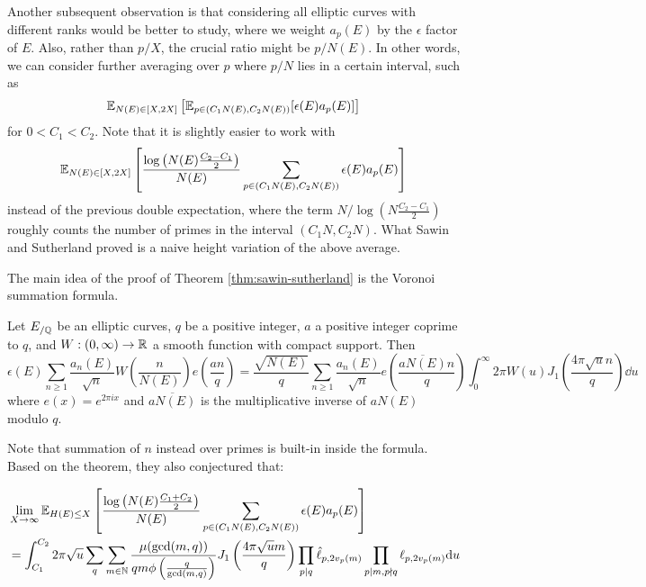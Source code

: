 Another subsequent observation is that considering all elliptic curves with different ranks would be better to study, where we weight $a_p(E)$ by the $\epsilon$ factor of $E$.
Also, rather than $p / X$, the crucial ratio might be $p / N(E)$. In other words, we can consider further averaging over $p$ where $p / N$ lies in a certain interval, such as
\[
\mathbb{E}_{N(E) \in [X, 2X]} \left[ \mathbb{E}_{p \in (C_1 N(E), C_2 N(E))} [\epsilon(E) a_p(E)]\right]
\]
for $0 < C_1 < C_2$.
Note that it is slightly easier to work with
\[
\mathbb{E}_{N(E) \in [X, 2X]} \left[ \frac{\log \left(N(E)\frac{C_2 - C_1}{2}\right)}{N(E)}\sum_{p \in (C_1 N(E), C_2 N(E))} \epsilon(E) a_p(E)\right]
\]
instead of the previous double expectation, where the term $N / \log(N \frac{C_2 - C_1}{2})$ roughly counts the number of primes in the interval $(C_1 N, C_2 N)$.
What Sawin and Sutherland proved is a naive height variation of the above average.

The main idea of the proof of Theorem \ref{thm:sawin-sutherland} is the Voronoi summation formula.

\begin{theorem}
    Let $E_{/\mathbb{Q}}$ be an elliptic curves, $q$ be a positive integer, $a$ a positive integer coprime to $q$, and $W: (0, \infty) \to \mathbb{R}$ a smooth function with compact support.
    Then
    \begin{equation}
        \epsilon(E) \sum_{n \ge 1} \frac{a_n(E)}{\sqrt{n}} W\left(\frac{n}{N(E)}\right) e\left(\frac{an}{q}\right) = \frac{\sqrt{N(E)}}{q} \sum_{n \ge 1} \frac{a_n(E)}{\sqrt{n}} e\left(\frac{\overline{aN(E)} n}{q}\right) \int_0^{\infty} 2 \pi W(u) J_1\left(\frac{4 \pi \sqrt{u}n}{q}\right) \dd u
    \end{equation}
    where $e(x) = e^{2 \pi i x}$ and $\overline{aN(E)}$ is the multiplicative inverse of $aN(E)$ modulo $q$.
\end{theorem}
Note that summation of $n$ instead over primes is built-in inside the formula.
Based on the theorem, they also conjectured that:

\begin{conjecture}
\begin{align*}
    &\lim_{X \to \infty} \mathbb{E}_{H(E) \le X} \left[\frac{\log\left(N(E) \frac{C_1 + C_2}{2}\right)}{N(E)} \sum_{p \in (C_1 N(E), C_2 N(E))} \epsilon(E) a_p(E)\right] \\
    &= \int_{C_1}^{C_2} 2 \pi \sqrt{u} \sum_{q} \sum_{m \in \mathbb{N}} \frac{\mu(\gcd(m, q))}{qm \phi\left(\frac{q}{\gcd(m, q)}\right)} J_1 \left(\frac{4 \pi \sqrt{u}m}{q}\right) \prod_{p \mid q} \hat{\ell}_{p, 2v_p(m)} \prod_{p \mid m, p \nmid q} \ell_{p, 2v_p(m)} \mathrm{d} u
\end{align*}
\end{conjecture}

